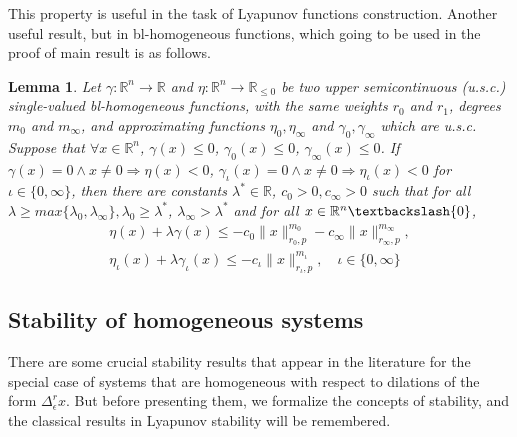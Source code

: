 \documentclass[11pt,letterpaper,twoside,openright]{report}
\newcommand{\RE}{\mathbb{R}}
\providecommand{\norm}[1]{\lVert#1\rVert}
\newtheorem{lemma}{Lemma}[chapter]
\begin{document}
This property is useful in the task of Lyapunov functions construction. Another useful result, but in bl-homogeneous functions, which going to be used in the proof of main result is as follows.

\begin{lemma}
	Let $\gamma: \RE^n \rightarrow \RE$ and  $\eta: \RE^n \rightarrow \RE_{\leq 0}$ be two upper semicontinuous (u.s.c.) single-valued bl-homogeneous functions, with the same weights $r_0$ and $r_1$, degrees $m_0$ and $m_{\infty}$, and approximating functions $\eta_{0},\eta_{\infty}$ and $\gamma_0,\gamma_{\infty}$ which are u.s.c. Suppose that $\forall x\in\RE^n$, $\gamma(x)\leq 0$, $\gamma_0(x)\leq 0$, $\gamma_{\infty}(x)\leq 0$. If $\gamma(x)=0 \wedge x\neq 0 \Rightarrow \eta(x)<0$, $\gamma_{\iota}(x)=0 \wedge x\neq 0 \Rightarrow \eta_{\iota}(x)<0$ for $\iota \in \{0,\infty\}$, then there are constants $\lambda^*\in\RE$, $c_0>0,c_{\infty}>0$ such that for all $\lambda \geq max\{\lambda_0,\lambda_{\infty}\}, \lambda_0 \geq \lambda^*$, $\lambda_{\infty}>\lambda^*$ and for all $x\in \RE^n \textbackslash \{0 \}$,
	\begin{equation}
		\begin{split}
		\eta(x)+\lambda\gamma(x) \leq -c_0\norm{x}_{r_0,p}^{m_0} - c_{\infty}\norm{x}_{r_{\infty},p}^{m_{\infty}}, \\
		\eta_{\iota}(x)+\lambda\gamma_{\iota}(x) \leq -c_{\iota}\norm{x}_{r_{\iota},p}^{m_{\iota}}, \quad \iota \in \{0,\infty\}
		\end{split}
	\end{equation}
\end{lemma}


\subsection{Stability of homogeneous systems}
There are some crucial stability results that appear in the literature for the special case of systems that are homogeneous with respect to dilations of the form  $\Delta_{\epsilon}^{r}x$. But before presenting them, we formalize the concepts of stability, and the classical results in Lyapunov stability will be remembered.
\end{document}
